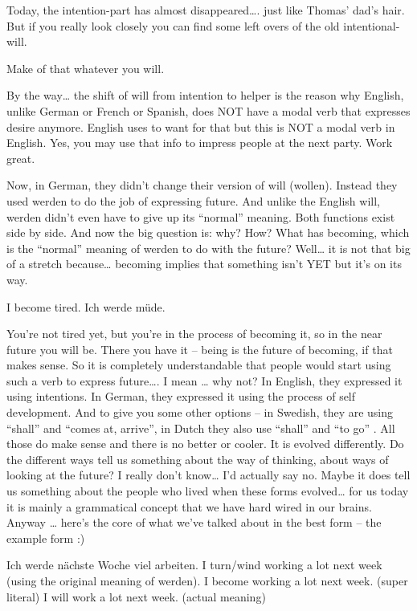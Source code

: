 \documentclass[a4paper,12pt]{article}
\begin{document}
\begin{adjustwidth}{2em}{0pt}
\begin{adjustwidth}{3em}{0pt}
Today, the intention-part has almost disappeared…. just like Thomas’ dad’s hair. But if you really look closely you can find some left overs of the old intentional-will.

    Make of that whatever you will. 

By the way… the shift of will from intention to helper is the reason why English, unlike German or French or Spanish, does NOT have a modal verb that expresses desire anymore. English uses to want for that but this is NOT a modal verb in English.
Yes, you may use that info to impress people at the next party. Work great.

Now, in German, they didn’t change their version of will (wollen). Instead they used werden to do the job of expressing future. And unlike the English will, werden didn’t even have to give up its “normal” meaning. Both functions exist side by side.
And now the big question is: why? How? What has becoming, which is the “normal” meaning of werden to do with the future?
Well… it is not that big of a stretch because…  becoming implies that something isn’t YET but it’s on its way.

    I become tired.
    Ich werde müde.

You’re not tired yet, but you’re in the process of becoming it, so in the near future you will be.  There you have it –  being is the future of becoming, if that makes sense.
So it is completely understandable that people would start using such a verb to express future…. I mean … why not?
In English, they expressed it using intentions. In German, they expressed it using the process of self development. And to give you some other options – in Swedish, they are using “shall” and “comes at, arrive”, in Dutch they also use “shall” and “to go” .
All those do make sense and there is  no better or cooler. It is evolved differently. Do the different ways tell us something about the way of thinking, about ways of looking at the future? I really don’t know… I’d actually say no. Maybe it does tell us something about the people who lived when these forms evolved…  for us today it is mainly a grammatical concept that we have hard wired in our brains.
Anyway … here’s the core of what we’ve talked about in the best form – the example form :)

    Ich werde nächste Woche viel arbeiten.
    I turn/wind working a lot next week (using the original meaning of werden).
    I become working a lot next week. (super literal)
    I will work a lot next week.  (actual meaning)


\end{adjustwidth}
\end{adjustwidth}
\end{document}
